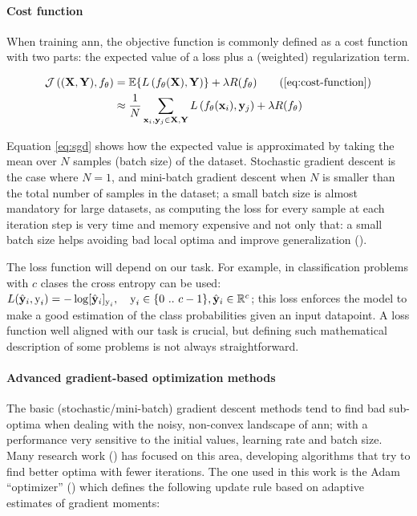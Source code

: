 \documentclass[../main.tex]{subfiles}
\begin{document}
\paragraph{Cost function} When training \gls{ann}, the objective function is
commonly defined as a cost function with two parts: the expected value of a
loss plus a (weighted) regularization term.

\begin{subequations}\label{eq:cost-function}
\begin{align}
\mathcal{J}\left( (\tensor{X}, \tensor{Y}), f_{\theta} \right) & =
\mathbb{E}\{ L \left( f_{\theta}(\tensor{X}), \tensor{Y} \right) \}
+ \lambda R(f_{\theta}) \tag{\ref{eq:cost-function}}\\
& \approx \frac{1}{N}
\sum_{\tensor{x}_i, \tensor{y}_j \in \tensor{X}, \tensor{Y}}
{L \left( f_{\theta} (\tensor{x}_i), \tensor{y}_j \right)}
+ \lambda R(f_{\theta}) \label{eq:sgd}
\end{align}
\end{subequations}

Equation \eqref{eq:sgd} shows how the expected
value is approximated by taking the mean over $N$ samples (batch size) of the
dataset.
Stochastic gradient descent is the case where $N=1$, and mini-batch
gradient descent when $N$ is smaller than the total number
of samples in the dataset; a small batch size is almost mandatory for large
datasets, as computing the loss for every sample at each iteration step is very
time and memory expensive and not only that: a small batch size helps avoiding
bad local optima and improve generalization
(\cite{DBLP:journals/corr/abs-1804-07612,Zhang2017No0}).

The loss function will depend on our task. For example, in classification
problems with $c$ clases the cross entropy can be used:
$ L(\hat{\mathbf{y}}_i, \text{y}_i) = -\log [\hat{\mathbf{y}}_i]_{\text{y}_i},
\quad \text{y}_i \in \{0\ ..\ c - 1\}, \hat{\mathbf{y}}_i \in \mathbb{R}^{c} $; this
loss enforces the model to make a good estimation of the class probabilities
given an input datapoint.
A loss function well aligned with our task is crucial, but defining such
mathematical description of some problems is not always straightforward.

\paragraph{Advanced gradient-based optimization methods}
The basic (stochastic/mini-batch) gradient descent methods tend to find bad
sub-optima when dealing with the noisy, non-convex landscape of \gls{ann};
with a performance very sensitive to the initial values, learning rate and
batch size.
Many research work
(\cite{Adagrad,Hinton2012RMSProp,Zeiler2012ADADELTA,Kingma2014Adam})
has focused on this area, developing algorithms that try to
find better optima with fewer iterations. The one used in this work
is the Adam ``optimizer'' (\cite{Kingma2014Adam}) which defines the following
update rule based on adaptive estimates of gradient moments:
\end{document}
